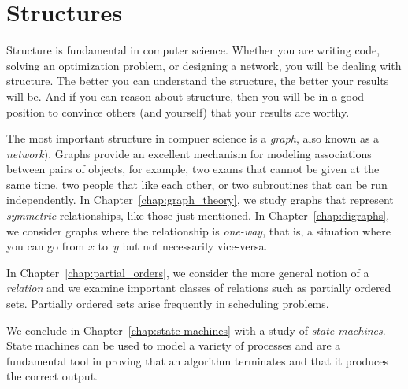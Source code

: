 \part{Structures}
\label{part:structures}

Structure is fundamental in computer science.  Whether you are writing
code, solving an optimization problem, or designing a network, you
will be dealing with structure.  The better you can understand the
structure, the better your results will be.  And if you can reason
about structure, then you will be in a good position to convince
others (and yourself) that your results are worthy.

The most important structure in compuer science is a \emph{graph},
also known as a \emph{network}).  Graphs provide an excellent
mechanism for modeling associations between pairs of objects, for
example, two exams that cannot be given at the same time, two people
that like each other, or two subroutines that can be run
independently.  In Chapter~\ref{chap:graph_theory}, we study graphs
that represent \emph{symmetric} relationships, like those just
mentioned.  In Chapter~\ref{chap:digraphs}, we consider graphs where
the relationship is \emph{one-way}, that is, a situation where you can
go from $x$ to~$y$ but not necessarily vice-versa.

In Chapter~\ref{chap:partial_orders}, we consider the more general
notion of a \emph{relation} and we examine important classes of
relations such as partially ordered sets.  Partially ordered sets
arise frequently in scheduling problems.

We conclude in Chapter~\ref{chap:state-machines} with a study of
\emph{state machines}.  State machines can be used to model a variety
of processes and are a fundamental tool in proving that an algorithm
terminates and that it produces the correct output.

\endinput

